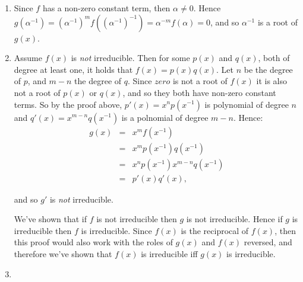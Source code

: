 \documentclass[11pt]{article} \usepackage{amssymb}
\begin{document}
\begin{enumerate}
\begin{enumerate}
  \item
    Since $f$ has a non-zero constant term, then $\alpha\neq 0$. Hence
    $g(\alpha^{-1})=(\alpha^{-1})^mf((\alpha^{-1})^{-1})=\alpha^{-m}f(\alpha)=0$, and so
    $\alpha^{-1}$ is a root of $g(x)$.

  \item

    Assume $f(x)$ is {\em not} irreducible. Then for some $p(x)$ and $q(x)$, 
    both of degree at least one, it holds
    that $f(x)=p(x)q(x)$. Let $n$ be the degree of $p$, and $m-n$ the degree of 
    $q$. Since $zero$ is not a root of $f(x)$ it is also not a root of $p(x)$
    or $q(x)$, and so they both have non-zero constant terms. So by
    the proof above, $p'(x)=x^np(x^{-1})$ is polynomial of degree $n$ and 
    $q'(x)=x^{m-n}q(x^{-1})$ is a polnomial of degree $m-n$. Hence:
    \begin{eqnarray*}
      g(x)&=& x^mf(x^{-1})
      \\ &=& x^mp(x^{-1})q(x^{-1})
      \\ &=& x^np(x^{-1})x^{m-n}q(x^{-1})
      \\ &=& p'(x)q'(x),
    \end{eqnarray*}

    and so $g'$ is {\em not} irreducible. 

    We've shown that if $f$ is not irreducible then $g$ is not irreducible. 
    Hence if $g$ is irreducible then $f$ is irreducible. Since $f(x)$ is
    the reciprocal of $f(x)$, then this proof would also work with the roles
    of $g(x)$ and $f(x)$ reversed, and therefore we've shown that $f(x)$
    is irreducible iff $g(x)$ is irreducible.

  \item
    
    
  
  \end{enumerate}
\end{enumerate}
\end{document}
